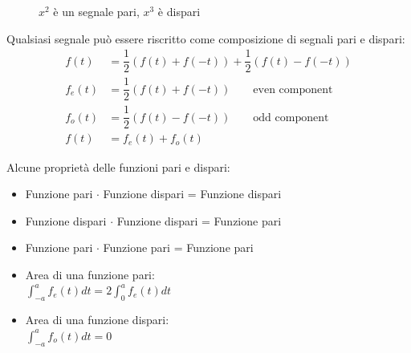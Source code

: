 \documentclass[a4paper, titlepage, oneside]{scrbook}
\begin{document}
\begin{figure}[h]
	\centering
\caption{$x^2$ è un segnale pari, $x^3$ è dispari}
\label{fig:segnale_pari_dispari}
\end{figure}

Qualsiasi segnale può essere riscritto come composizione di segnali pari e dispari:
\begin{align*}
	f(t)&=\dfrac{1}{2}(f(t)+f(-t))+\dfrac{1}{2}(f(t)-f(-t)) \\
	f_{e}(t)&=\dfrac{1}{2}(f(t)+f(-t)) \qquad \text{even component} \\
	f_{o}(t)&=\dfrac{1}{2}(f(t)-f(-t)) \qquad \text{odd component} \\
	f(t)&=f_{e}(t)+f_{o}(t)
\end{align*}

Alcune proprietà delle funzioni pari e dispari:
\begin{itemize}
	\item Funzione pari $\cdot$ Funzione dispari = Funzione dispari
	\item Funzione dispari $\cdot$ Funzione dispari = Funzione pari
	\item Funzione pari $\cdot$ Funzione pari = Funzione pari
	\item Area di una funzione pari:\\
	$\int_{-a}^{a} f_{e}(t) dt = 2\int_{0}^{a} f_{e}(t) dt$
	\item Area di una funzione dispari:\\
	$\int_{-a}^{a} f_{o}(t) dt = 0$
\end{itemize}
\end{document}

